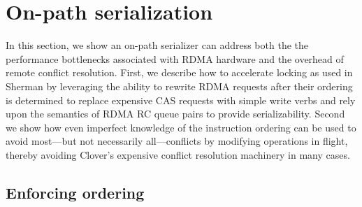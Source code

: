 \section{On-path serialization}

In this section, we show an on-path serializer can address both the
the performance bottlenecks associated with RDMA hardware and the
overhead of remote conflict resolution.  First, we describe how to
accelerate locking as used in Sherman by leveraging the ability to
rewrite RDMA requests after their ordering is determined to replace
expensive CAS requests with simple write verbs and rely upon the
semantics of RDMA RC queue pairs to provide serializability.
Second we show how even imperfect knowledge of the instruction ordering
can be used to avoid most---but not necessarily all---conflicts by
modifying operations in flight, thereby avoiding Clover's expensive
conflict resolution machinery in many cases.




\subsection{Enforcing ordering}
\label{ea}

